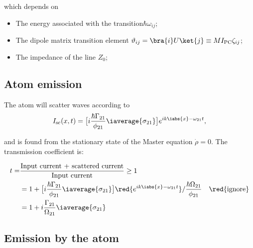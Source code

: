 \noindent which depends on
\begin{itemize}
	\item The energy associated with the transition\hfill $ \hbar\omega_{ij} $;
	\item The dipole matrix transition element \hfill $ \vartheta_{ij} = \bra{i}U\ket{j} \equiv MI_\text{PC}\zeta_{ij}$;
	\item The impedance of the line \hfill $ Z_0 $;
\end{itemize}

\subsection{Atom emission}
The atom will scatter waves according to
\[
I_\text{sc}(x,t) = \big[i\frac{\hbar\Gamma_{21}}{\phi_{21}}\iaverage{\sigma_{21}}\big]e^{ik\iabs{x}-\omega_{21}t},
\]

\noindent and  is found from the stationary state of the Master equation $ \dot{\rho} = 0 $. The transmission coefficient is:

\[
\begin{aligned}
t = & \frac{\text{Input current + scattered current}}{\text{Input current}} \ge 1\\
& = 1 + \big[i\frac{\hbar\Gamma_{21}}{\phi_{21}}\iaverage{\sigma_{21}}\big]\red{e^{ik\iabs{x}-\omega_{21}t}}/\frac{\hbar\Omega_{21}}{\phi_{21}}\quad \red{\text{ignore}}\\
& = 1 + i\frac{\Gamma_{21}}{\Omega_{21}}\iaverage{\sigma_{21}}
\end{aligned}
\]


\subsection{Emission by the atom\label{subsec:Scattering}}  

